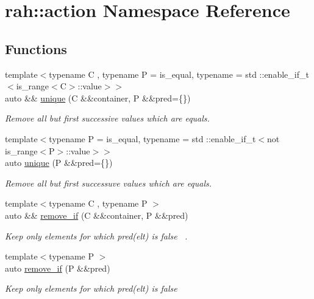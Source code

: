 \hypertarget{namespacerah_1_1action}{}\section{rah\+::action Namespace Reference}
\label{namespacerah_1_1action}
\subsection*{Functions}
\begin{DoxyCompactItemize}
\item 
{\footnotesize template$<$typename C , typename P  = is\+\_\+equal, typename  = std \+::enable\+\_\+if\+\_\+t$<$is\+\_\+range$<$\+C$>$\+::value$>$$>$ }\\auto \&\& \mbox{\hyperlink{namespacerah_1_1action_a77387ae50600982d52d0d41623747b84}{unique}} (C \&\&container, P \&\&pred=\{\})
\begin{DoxyCompactList}\small\item\em Remove all but first successive values which are equals. \end{DoxyCompactList}\item 
{\footnotesize template$<$typename P  = is\+\_\+equal, typename  = std \+::enable\+\_\+if\+\_\+t$<$not is\+\_\+range$<$\+P$>$\+::value$>$$>$ }\\auto \mbox{\hyperlink{namespacerah_1_1action_a2b3773f4b775a1e64307307556af24cd}{unique}} (P \&\&pred=\{\})
\begin{DoxyCompactList}\small\item\em Remove all but first successuve values which are equals. \end{DoxyCompactList}\item 
{\footnotesize template$<$typename C , typename P $>$ }\\auto \&\& \mbox{\hyperlink{namespacerah_1_1action_ab774cddf0da3ae6a4b505d8a2e05b0c7}{remove\+\_\+if}} (C \&\&container, P \&\&pred)
\begin{DoxyCompactList}\small\item\em Keep only elements for which pred(elt) is false~\newline
. \end{DoxyCompactList}\item 
{\footnotesize template$<$typename P $>$ }\\auto \mbox{\hyperlink{namespacerah_1_1action_a708ce68c6ed2b20ef9c0cdb6b697c980}{remove\+\_\+if}} (P \&\&pred)
\begin{DoxyCompactList}\small\item\em Keep only elements for which pred(elt) is false~\newline

\end{DoxyCompactList}
\end{DoxyCompactItemize}
